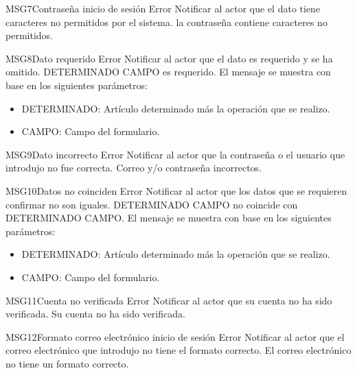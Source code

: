 \begin{Message}{MSG7}{Contraseña inicio de sesión} 
	\MSGitem[Tipo: ] Error
	\MSGitem[Objetivo: ] Notificar al actor que el dato tiene caracteres no permitidos por el sistema.
	\MSGitem[Redacción: ] la contraseña contiene caracteres no permitidos.
\end{Message}

\begin{Message}{MSG8}{Dato requerido} 
	\MSGitem[Tipo: ] Error
	\MSGitem[Objetivo: ] Notificar al actor que el dato es requerido y se ha omitido.
	\MSGitem[Redacción: ] DETERMINADO CAMPO es requerido.
	\MSGitem[Parámetros: ] El mensaje se muestra con base en los siguientes parámetros:
		\begin{itemize}	
			\item DETERMINADO: Artículo determinado más la operación que se realizo.
			\item CAMPO: Campo del formulario.
		\end{itemize}
\end{Message}

\begin{Message}{MSG9}{Dato incorrecto} 
	\MSGitem[Tipo: ] Error
	\MSGitem[Objetivo: ] Notificar al actor que la contraseña o el usuario que introdujo no fue correcta.
	\MSGitem[Redacción: ] Correo y/o contraseña incorrectos.
\end{Message}

\begin{Message}{MSG10}{Datos no coinciden} 
	\MSGitem[Tipo: ] Error
	\MSGitem[Objetivo: ] Notificar al actor que los datos que se requieren confirmar no son iguales.
	\MSGitem[Redacción: ] DETERMINADO CAMPO no coincide con DETERMINADO CAMPO.
	\MSGitem[Parámetros: ] El mensaje se muestra con base en los siguientes parámetros:
		\begin{itemize}	
			\item DETERMINADO: Artículo determinado más la operación que se realizo.
			\item CAMPO: Campo del formulario.
		\end{itemize}
\end{Message}

\begin{Message}{MSG11}{Cuenta no verificada} 
	\MSGitem[Tipo: ] Error
	\MSGitem[Objetivo: ] Notificar al actor que su cuenta no ha sido verificada.
	\MSGitem[Redacción: ] Su cuenta no ha sido verificada.
\end{Message}

\begin{Message}{MSG12}{Formato correo electrónico inicio de sesión} 
	\MSGitem[Tipo: ] Error
	\MSGitem[Objetivo: ] Notificar al actor que el correo electrónico que introdujo no tiene el formato correcto.
	\MSGitem[Redacción: ] El correo electrónico no tiene un formato correcto.
\end{Message}

